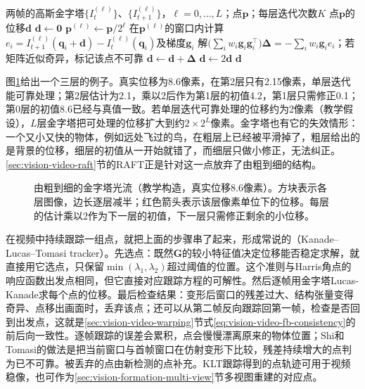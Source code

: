 \begin{algorithm}
  \label{alg:vision-videofound-pyramid-lk}
  \begin{algorithmic}[1]
    \Require 两帧的高斯金字塔$\{I_t^{(\ell)}\}$、$\{I_{t+1}^{(\ell)}\}$，$\ell=0,\ldots,L$；点$\bm p$；每层迭代次数$K$
    \Ensure 点$\bm p$的位移$\bm d$
    \State $\bm d\gets\bm 0$
      \State $\bm p^{(\ell)}\gets\bm p/2^{\ell}$
        \State 在$\bm p^{(\ell)}$的窗口内计算$e_i=I_{t+1}^{(\ell)}(\bm q_i+\bm d)-I_t^{(\ell)}(\bm q_i)$及梯度$\bm g_i$
        \State 解$\bigl(\sum_iw_i\bm g_i\bm g_i^\top\bigr)\bm\Delta=-\sum_iw_i\bm g_ie_i$；若矩阵近似奇异，标记该点不可靠
        \State $\bm d\gets\bm d+\bm\Delta$
      \EndFor
        \State $\bm d\gets2\bm d$
      \EndIf
    \EndFor
    \State \Return $\bm d$
  \end{algorithmic}
\end{algorithm}

图\ref{fig:vision-videofound-flow-pyramid}给出一个三层的例子。真实位移为8.6像素，在第2层只有2.15像素，单层迭代能可靠处理；第2层估计为2.1，乘以2后作为第1层的初值4.2，第1层只需修正0.1；第0层的初值8.6已经与真值一致。若单层迭代可靠处理的位移约为2像素（教学假设），$L$层金字塔把可处理的位移扩大到约$2\times2^{L}$像素。金字塔也有它的失效情形：一个又小又快的物体，例如远处飞过的鸟，在粗层上已经被平滑掉了，粗层给出的是背景的位移，细层的初值从一开始就错了，而细层只做小修正，无法纠正。\ref{sec:vision-video-raft}节的RAFT正是针对这一点放弃了由粗到细的结构。

\begin{figure}[htbp]
  \centering
  
  \caption{由粗到细的金字塔光流（教学构造，真实位移8.6像素）。方块表示各层图像，边长逐层减半；红色箭头表示该层像素单位下的位移。每层的估计乘以2作为下一层的初值，下一层只需修正剩余的小位移。}
  \label{fig:vision-videofound-flow-pyramid}
\end{figure}

在视频中持续跟踪一组点，就把上面的步骤串了起来，形成常说的（Kanade--Lucas--Tomasi tracker）。先选点：既然$\bm G$的较小特征值决定位移能否稳定求解，就直接用它选点，只保留$\min(\lambda_1,\lambda_2)$超过阈值的位置。这个准则与Harris角点的响应函数出发点相同，但它直接对应跟踪方程的可解性。然后逐帧用金字塔Lucas-Kanade求每个点的位移。最后检查结果：变形后窗口的残差过大、结构张量变得奇异、点移出画面时，丢弃该点；还可以从第二帧反向跟踪回第一帧，检查是否回到出发点，这就是\ref{sec:vision-video-warping}节式\eqref{eq:vision-video-fb-consistency}的前后向一致性。逐帧跟踪的误差会累积，点会慢慢漂离原来的物体位置；Shi和Tomasi的做法是把当前窗口与首帧窗口在仿射变形下比较，残差持续增大的点判为已不可靠。被丢弃的点由新检测的点补充。KLT跟踪得到的点轨迹可用于视频稳像，也可作为\ref{sec:vision-formation-multi-view}节多视图重建的对应点。

